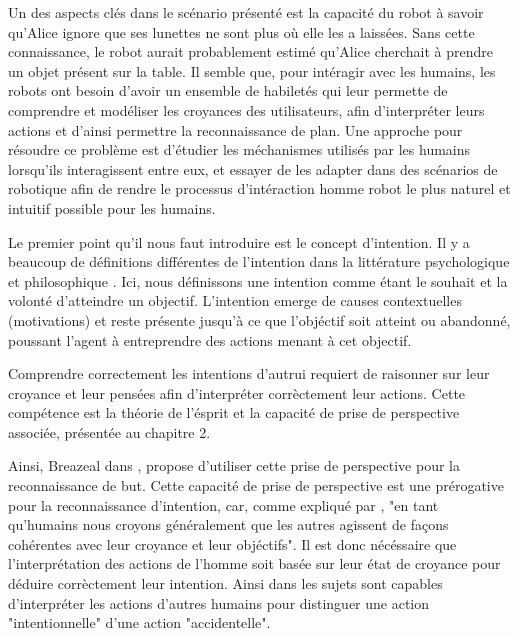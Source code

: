 \documentclass[a4paper,11pt,twoside]{StyleThese}
\begin{document}
Un des aspects clés dans le scénario présenté est la capacité du robot à savoir qu'Alice ignore que ses lunettes ne sont plus où elle les a laissées. Sans cette connaissance, le robot aurait probablement estimé qu'Alice cherchait à prendre un objet présent sur la table. 
Il semble que, pour intéragir avec les humains, les robots ont besoin d'avoir un ensemble de habiletés qui leur permette de comprendre et modéliser les croyances des utilisateurs, afin d'interpréter leurs actions et d'ainsi permettre la reconnaissance de plan. Une approche pour résoudre ce problème est d'étudier les méchanismes utilisés par les humains lorsqu'ils interagissent entre eux, et essayer de les adapter dans des scénarios de robotique afin de rendre le processus d'intéraction homme robot le plus naturel et intuitif possible pour les humains.

Le premier point qu'il nous faut introduire est le concept d'intention. Il y a beaucoup de définitions différentes de l'intention dans la littérature psychologique  \cite{bruner1981} et philosophique \cite{bratman1984}. Ici, nous définissons une intention comme étant le souhait et la volonté d'atteindre un objectif. L'intention emerge de causes contextuelles (motivations) et reste présente jusqu'à ce que l'objéctif soit atteint ou abandonné, poussant l'agent à entreprendre des actions menant à cet objectif.

Comprendre correctement les intentions d'autrui requiert de raisonner sur leur croyance et leur pensées afin d'interpréter corrèctement leur actions. Cette compétence est la théorie de l'ésprit et la capacité de prise de perspective associée, présentée au chapitre 2.

Ainsi, Breazeal dans \cite{BreazealGB09}, propose d'utiliser cette prise de perspective pour la reconnaissance de but. Cette capacité de prise de perspective est une prérogative pour la reconnaissance d'intention, car, comme expliqué par \cite{byom2013theory}, "en tant qu'humains nous croyons généralement que les autres agissent de façons cohérentes avec leur croyance et leur objéctifs". Il est donc nécéssaire que l'interprétation des actions de l'homme soit basée sur leur état de croyance pour déduire corrèctement leur intention. Ainsi dans \cite{Call1998} les sujets sont capables d'interpréter les actions d'autres humains pour distinguer une action "intentionnelle" d'une action "accidentelle".
\end{document}
